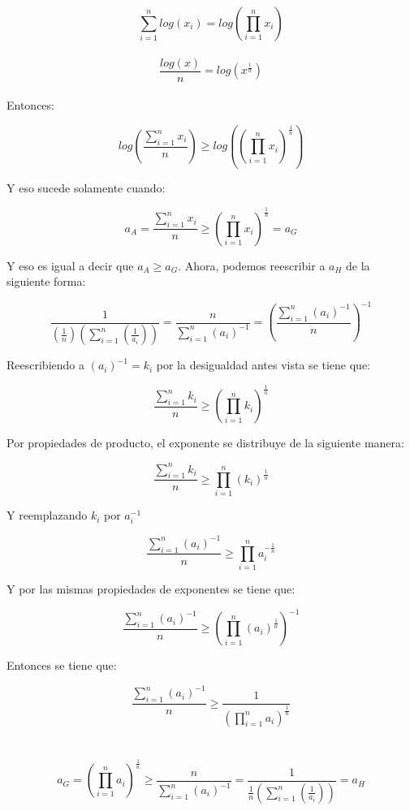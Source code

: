 \documentclass[12pt,a4paper]{report}
\begin{document}
\begin{enumerate}
{		   $$\sum_{i=1}^{n}log(x_{i})=log(\prod_{i=1}^{n}x_{i})$$ \\ 
		      $$\frac{log(x)}{n}=log(x^{\frac{1}{n}})$$\\
		      Entonces:\\
		      \begin{center}
		     $$log(\frac{\sum_{i=1}^{n}x_{i}}{n})\geq log((\prod_{i=1}^{n}x_{i})^{\frac{1}{n}})
		      $$\end{center}
		      Y eso sucede solamente cuando:\\
		      \begin{center}
		          $$a_{A}=\frac{\sum_{i=1}^{n}x_{i}}{n} \geq (\prod_{i=1}^{n}x_{i})^{\frac{1}{n}}=a_{G}$$
		      \end{center}
		      Y eso es igual a decir que $a_{A}\geq a_{G}$. Ahora, podemos reescribir a $a_{H}$ de la siguiente forma:\\
		      \begin{center}
		          $$\frac{1}{(\frac{1}{n})(\sum_{i=1}^{n}(\frac{1}{a_{i}}))}=\frac{n}{\sum_{i=1}^{n}(a_{i})^{-1}}=(\frac{\sum_{i=1}^{n}(a_{i})^{-1}}{n})^{-1}$$
		      \end{center}
		      Reescribiendo a $(a_{i})^{-1}=k_{i}$ por la desigualdad antes vista se tiene que:\\
		      \begin{center}
		          $$\frac{\sum_{i=1}^{n}k_{i}}{n}\geq (\prod_{i=1}^{n}k_{i})^{\frac{1}{n}}$$
		      \end{center}
		      Por propiedades de producto, el exponente se distribuye de la siguiente manera:\\
		      \begin{center}
		          $$\frac{\sum_{i=1}^{n}k_{i}}{n}\geq \prod_{i=1}^{n}(k_{i})^{\frac{1}{n}}$$
		      \end{center}
		      Y reemplazando $k_{i}$ por $a_{i}^{-1}$\\
		      \begin{center}
		          $$\frac{\sum_{i=1}^{n}(a_{i})^{-1}}{n} \geq \prod_{i=1}^{n}a_{i}^{-\frac{1}{n}}$$
		      \end{center}
		      Y por las mismas propiedades de exponentes se tiene que:\\
		      \begin{center}
		          $$\frac{\sum_{i=1}^{n}(a_{i})^{-1}}{n}\geq (\prod_{i=1}^{n}(a_{i})^{\frac{1}{n}})^{-1}$$
		      \end{center}
		      
		      Entonces se tiene que:\\
		      \begin{center}
		          $$\frac{\sum_{i=1}^{n}(a_{i})^{-1}}{n}\geq \frac{1}{(\prod_{i=1}^{n}a_{i})^{\frac{1}{n}}}$$\\ \\
		          $$a_{G}=(\prod_{i=1}^{n}a_{i})^{\frac{1}{n}}\geq \frac{n}{\sum_{i=1}^{n}(a_{i})^{-1}}=\frac{1}{\frac{1}{n}(\sum_{i=1}^{n}(\frac{1}{a_{i}}))}=a_{H}$$
		          

\end{center}}
\end{enumerate}
\end{document}
